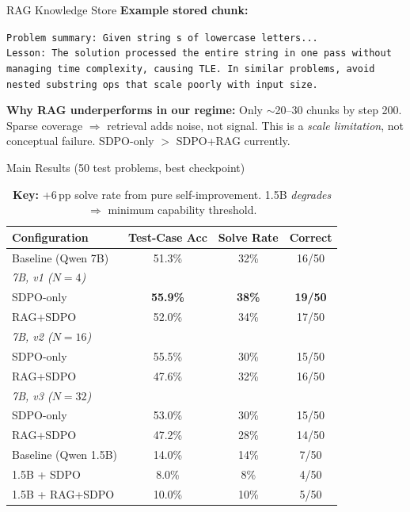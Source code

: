 \documentclass[final]{beamer}
\newlength{\colwidth}
\begin{document}
\begin{frame}[t]
\begin{columns}[t]
\begin{column}{\colwidth}
\begin{block}{RAG Knowledge Store}
\textbf{Example stored chunk:}

{\scriptsize\texttt{Problem summary: Given string s of lowercase letters...}}\\
{\scriptsize\texttt{Lesson: The solution processed the entire string in one pass without managing time complexity, causing TLE. In similar problems, avoid nested substring ops that scale poorly with input size.}}

\textbf{Why RAG underperforms in our regime:} Only $\sim$20--30 chunks by step 200. Sparse coverage $\Rightarrow$ retrieval adds noise, not signal. This is a \emph{scale limitation}, not conceptual failure. SDPO-only $>$ SDPO+RAG currently.

\end{block}

\begin{block}{Main Results (50 test problems, best checkpoint)}

\begin{table}
\centering
\small
\begin{tabular}{lccc}
\toprule
\textbf{Configuration} & \textbf{Test-Case Acc} & \textbf{Solve Rate} & \textbf{Correct}\\
\midrule
Baseline (Qwen 7B) & 51.3\% & 32\% & 16/50\\
\midrule
\multicolumn{4}{l}{\textit{7B, v1 ($N{=}4$)}}\\
\quad SDPO-only & \textbf{55.9\%} & \textbf{38\%} & \textbf{19/50}\\
\quad RAG+SDPO & 52.0\% & 34\% & 17/50\\
\midrule
\multicolumn{4}{l}{\textit{7B, v2 ($N{=}16$)}}\\
\quad SDPO-only & 55.5\% & 30\% & 15/50\\
\quad RAG+SDPO & 47.6\% & 32\% & 16/50\\
\midrule
\multicolumn{4}{l}{\textit{7B, v3 ($N{=}32$)}}\\
\quad SDPO-only & 53.0\% & 30\% & 15/50\\
\quad RAG+SDPO & 47.2\% & 28\% & 14/50\\
\midrule
Baseline (Qwen 1.5B) & 14.0\% & 14\% & 7/50\\
\quad 1.5B + SDPO & 8.0\% & 8\% & 4/50\\
\quad 1.5B + RAG+SDPO & 10.0\% & 10\% & 5/50\\
\bottomrule
\end{tabular}
\caption*{\scriptsize \textbf{Key:} +6\,pp solve rate from pure self-improvement. 1.5B \emph{degrades} $\Rightarrow$ minimum capability threshold.}
\end{table}


\end{block}
\end{column}
\end{columns}
\end{frame}
\end{document}
